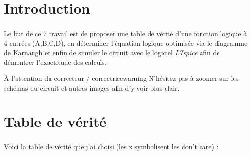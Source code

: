 \section{Introduction}

    \subparagraph{}Le but de ce {\color{info}7\ieme{} travail} est de proposer une table de vérité d’une fonction 
    logique à 4 entrées (A,B,C,D), en déterminer l’équation logique optimisée via le diagramme de Karnaugh et enfin de 
    simuler le circuit avec le logiciel \textit{LTspice} afin de démontrer l'exactitude des calculs.\\[1.5cm]
    
    \begin{titletbox}{À l'attention du correcteur / correctrice}{warning}
        N'hésitez pas à zoomer sur les schémas du circuit et autres images afin d'y voir plus clair.
    \end{titletbox}

    \section{Table de vérité}

    \subparagraph{}Voici la table de vérité que j'ai choisi (les x symbolisent les don't care) :
        


